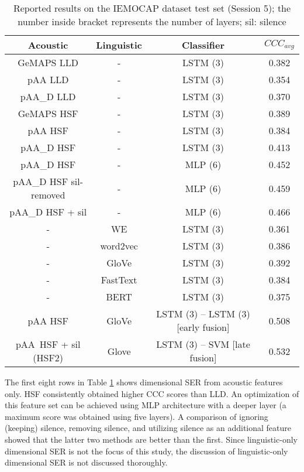 \begin{table}[htbp]
    \begin{center}
\caption{Reported results on the IEMOCAP dataset test set (Session 5); the
number inside bracket represents the number of layers; sil: silence}
    \begin{tabular}{c c c c}
    \hline   
Acoustic & Linguistic & Classifier & $CCC_{avg}$ \\
\hline \hline   
GeMAPS LLD & - & LSTM (3) &  0.382 \\
pAA LLD    & - & LSTM (3) &  0.354 \\
pAA\_D LLD  & - & LSTM (3) &  0.370 \\
GeMAPS HSF & - & LSTM (3) &  0.389 \\
pAA HSF    & - & LSTM (3) &  0.384 \\
pAA\_D HSF  & - & LSTM (3) &  0.413 \\
pAA\_D HSF  & - & MLP (6) & 0.452 \\
pAA\_D HSF sil-removed & -  & MLP (6) & 0.459 \\
pAA\_D HSF + sil & - & MLP (6) & 0.466 \\
- & WE &  LSTM (3) &    0.361 \\
- & word2vec    &   LSTM (3)   &   0.386  \\
- & GloVe &   LSTM  (3)  &   0.392 \\
- & FastText &    LSTM  (3)  &   0.384 \\
- & BERT    &  LSTM (3)    &   0.375 \\
pAA HSF & GloVe &   LSTM (3) -- LSTM (3) [early fusion]    &   0.508 \\
pAA\ HSF + sil (HSF2) & Glove & LSTM (3) -- SVM [late fusion]      
&   0.532 \\
    \hline
    \end{tabular}
    \label{tab:sum_ch7}
    \end{center}
\end{table}

The first eight rows in Table \ref{tab:sum_ch7} shows dimensional SER from
acoustic features only. HSF consistently obtained higher CCC scores than LLD.
An optimization of this feature set can be achieved using MLP architecture with
a deeper layer (a maximum score was obtained using five layers). A comparison
of ignoring (keeping) silence, removing silence, and utilizing silence as an
additional feature showed that the latter two methods are better than the
first. Since linguistic-only dimensional SER is not the focus of this study,
the discussion of linguistic-only dimensional SER is not discussed thoroughly.


